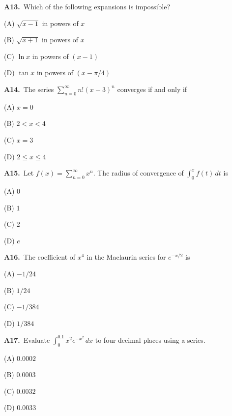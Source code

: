 \documentclass[11pt]{article}
\begin{document}
\bigskip\noindent\textbf{A13.}\ Which of the following expansions is impossible?
\begin{list}{}{\setlength{\leftmargin}{3em}\setlength{\labelwidth}{2.5em}\setlength{\itemsep}{0pt}\setlength{\topsep}{2pt}}
\item[(A)] $\sqrt{x-1}$ in powers of $x$
\item[(B)] $\sqrt{x+1}$ in powers of $x$
\item[(C)] $\ln x$ in powers of $(x-1)$
\item[(D)] $\tan x$ in powers of $(x-\pi/4)$
\end{list}

\bigskip\noindent\textbf{A14.}\ The series $\sum_{n=0}^\infty n!(x-3)^n$ converges if and only if
\begin{list}{}{\setlength{\leftmargin}{3em}\setlength{\labelwidth}{2.5em}\setlength{\itemsep}{0pt}\setlength{\topsep}{2pt}}
\item[(A)] $x=0$
\item[(B)] $2<x<4$
\item[(C)] $x=3$
\item[(D)] $2\leq x\leq4$
\end{list}

\bigskip\noindent\textbf{A15.}\ Let $f(x)=\displaystyle\sum_{n=0}^\infty x^n$. The radius of convergence of $\displaystyle\int_0^x f(t)\,dt$ is
\begin{list}{}{\setlength{\leftmargin}{3em}\setlength{\labelwidth}{2.5em}\setlength{\itemsep}{0pt}\setlength{\topsep}{2pt}}
\item[(A)] $0$
\item[(B)] $1$
\item[(C)] $2$
\item[(D)] $e$
\end{list}

\bigskip\noindent\textbf{A16.}\ The coefficient of $x^4$ in the Maclaurin series for $e^{-x/2}$ is
\begin{list}{}{\setlength{\leftmargin}{3em}\setlength{\labelwidth}{2.5em}\setlength{\itemsep}{0pt}\setlength{\topsep}{2pt}}
\item[(A)] $-1/24$
\item[(B)] $1/24$
\item[(C)] $-1/384$
\item[(D)] $1/384$
\end{list}

\bigskip\noindent\textbf{A17.}\ Evaluate $\int_0^{0.1}x^2e^{-x^2}\,dx$ to four decimal places using a series.
\begin{list}{}{\setlength{\leftmargin}{3em}\setlength{\labelwidth}{2.5em}\setlength{\itemsep}{0pt}\setlength{\topsep}{2pt}}
\item[(A)] $0.0002$
\item[(B)] $0.0003$
\item[(C)] $0.0032$
\item[(D)] $0.0033$
\end{list}
\end{document}
